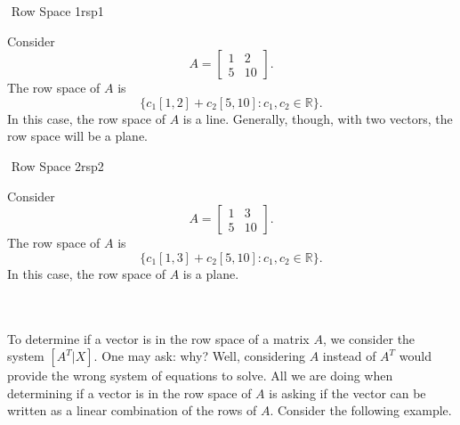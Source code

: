         \begin{example}{\Difficulty\,\,Row Space 1}{rsp1}
        
            Consider
            \begin{equation*}
                A=\begin{bmatrix}
                    1 & 2 \\
                    5 & 10
                \end{bmatrix}.
            \end{equation*} 
            The row space of \(A\) is 
            \begin{equation*}
                 \{c_1[1,2]+c_2[5,10]:c_1,c_2\in\mathbb{R}\}.
            \end{equation*}
            In this case, the row space of \(A\) is a line. Generally, though, with two vectors, the row space will be a plane.
        \end{example}
        \begin{example}{\Difficulty\,\,Row Space 2}{rsp2}
        
            Consider
            \begin{equation*}
                A=\begin{bmatrix}
                    1 & 3 \\
                    5 & 10
                \end{bmatrix}.
            \end{equation*} 
            The row space of \(A\) is 
            \begin{equation*}
                 \{c_1[1,3]+c_2[5,10]:c_1,c_2\in\mathbb{R}\}.
            \end{equation*}
            In this case, the row space of \(A\) is a plane.
        \end{example}
        \pagebreak
        \vphantom
        \\
        \\
        To determine if a vector is in the row space of a matrix \(A\), we consider the system \([A^T|X]\). One may ask: why? Well, considering \(A\) instead of \(A^T\) would provide the wrong system of equations to solve. All we are doing when determining if a vector is in the row space of \(A\) is asking if the vector can be written as a linear combination of the rows of \(A\). Consider the following example.
